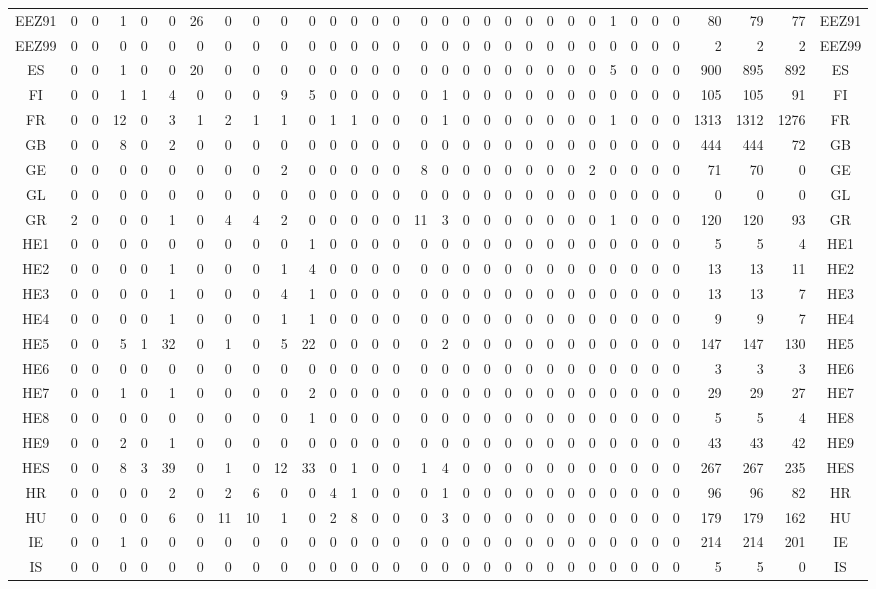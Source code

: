 \documentclass[10pt,a4paper,twoside]{report}
\begin{document}
{\begin{tabular}{crrrrrrrrrrrrrrrrrrrrrrrrrrrrrrc}
EEZ91&0&0&1&0&0&26&0&0&0&0&0&0&0&0&0&0&0&0&0&0&0&0&0&1&0&0&0&80&79&77&EEZ91\\
EEZ99&0&0&0&0&0&0&0&0&0&0&0&0&0&0&0&0&0&0&0&0&0&0&0&0&0&0&0&2&2&2&EEZ99\\
ES&0&0&1&0&0&20&0&0&0&0&0&0&0&0&0&0&0&0&0&0&0&0&0&5&0&0&0&900&895&892&ES\\
FI&0&0&1&1&4&0&0&0&9&5&0&0&0&0&0&1&0&0&0&0&0&0&0&0&0&0&0&105&105&91&FI\\
FR&0&0&12&0&3&1&2&1&1&0&1&1&0&0&0&1&0&0&0&0&0&0&0&1&0&0&0&1313&1312&1276&FR\\
GB&0&0&8&0&2&0&0&0&0&0&0&0&0&0&0&0&0&0&0&0&0&0&0&0&0&0&0&444&444&72&GB\\
GE&0&0&0&0&0&0&0&0&2&0&0&0&0&0&8&0&0&0&0&0&0&0&2&0&0&0&0&71&70&0&GE\\
GL&0&0&0&0&0&0&0&0&0&0&0&0&0&0&0&0&0&0&0&0&0&0&0&0&0&0&0&0&0&0&GL\\
GR&2&0&0&0&1&0&4&4&2&0&0&0&0&0&11&3&0&0&0&0&0&0&0&1&0&0&0&120&120&93&GR\\
HE1&0&0&0&0&0&0&0&0&0&1&0&0&0&0&0&0&0&0&0&0&0&0&0&0&0&0&0&5&5&4&HE1\\
HE2&0&0&0&0&1&0&0&0&1&4&0&0&0&0&0&0&0&0&0&0&0&0&0&0&0&0&0&13&13&11&HE2\\
HE3&0&0&0&0&1&0&0&0&4&1&0&0&0&0&0&0&0&0&0&0&0&0&0&0&0&0&0&13&13&7&HE3\\
HE4&0&0&0&0&1&0&0&0&1&1&0&0&0&0&0&0&0&0&0&0&0&0&0&0&0&0&0&9&9&7&HE4\\
HE5&0&0&5&1&32&0&1&0&5&22&0&0&0&0&0&2&0&0&0&0&0&0&0&0&0&0&0&147&147&130&HE5\\
HE6&0&0&0&0&0&0&0&0&0&0&0&0&0&0&0&0&0&0&0&0&0&0&0&0&0&0&0&3&3&3&HE6\\
HE7&0&0&1&0&1&0&0&0&0&2&0&0&0&0&0&0&0&0&0&0&0&0&0&0&0&0&0&29&29&27&HE7\\
HE8&0&0&0&0&0&0&0&0&0&1&0&0&0&0&0&0&0&0&0&0&0&0&0&0&0&0&0&5&5&4&HE8\\
HE9&0&0&2&0&1&0&0&0&0&0&0&0&0&0&0&0&0&0&0&0&0&0&0&0&0&0&0&43&43&42&HE9\\
HES&0&0&8&3&39&0&1&0&12&33&0&1&0&0&1&4&0&0&0&0&0&0&0&0&0&0&0&267&267&235&HES\\
HR&0&0&0&0&2&0&2&6&0&0&4&1&0&0&0&1&0&0&0&0&0&0&0&0&0&0&0&96&96&82&HR\\
HU&0&0&0&0&6&0&11&10&1&0&2&8&0&0&0&3&0&0&0&0&0&0&0&0&0&0&0&179&179&162&HU\\
IE&0&0&1&0&0&0&0&0&0&0&0&0&0&0&0&0&0&0&0&0&0&0&0&0&0&0&0&214&214&201&IE\\
IS&0&0&0&0&0&0&0&0&0&0&0&0&0&0&0&0&0&0&0&0&0&0&0&0&0&0&0&5&5&0&IS\\

\end{tabular}}
\end{document}
